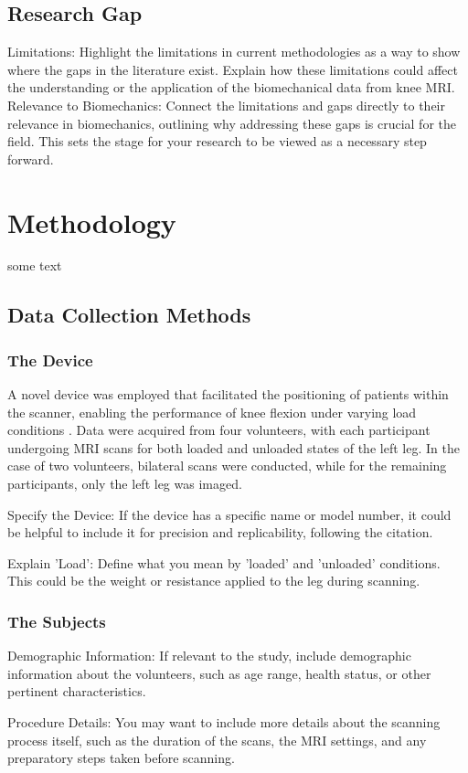 \documentclass{micro-econ-thesis}
\begin{document}
\subsection{Research Gap}
Limitations: Highlight the limitations in current methodologies as a way to show where the gaps in the literature exist. Explain how these limitations could affect the understanding or the application of the biomechanical data from knee MRI.
Relevance to Biomechanics: Connect the limitations and gaps directly to their relevance in biomechanics, outlining why addressing these gaps is crucial for the field. This sets the stage for your research to be viewed as a necessary step forward.

\section{Methodology}
\label{sec:second}
some text 
\subsection{Data Collection Methods}
\subsubsection{The Device}
A novel device was employed that facilitated the positioning of patients within the scanner, enabling the performance of knee flexion under varying load conditions \parencite{brisson_novel_2022}. Data were acquired from four volunteers, with each participant undergoing MRI scans for both loaded and unloaded states of the left leg. In the case of two volunteers, bilateral scans were conducted, while for the remaining participants, only the left leg was imaged.


Specify the Device: If the device has a specific name or model number, it could be helpful to include it for precision and replicability, following the citation.

Explain 'Load': Define what you mean by 'loaded' and 'unloaded' conditions. This could be the weight or resistance applied to the leg during scanning.
\subsubsection{The Subjects}
Demographic Information: If relevant to the study, include demographic information about the volunteers, such as age range, health status, or other pertinent characteristics.

Procedure Details: You may want to include more details about the scanning process itself, such as the duration of the scans, the MRI settings, and any preparatory steps taken before scanning.
\end{document}
